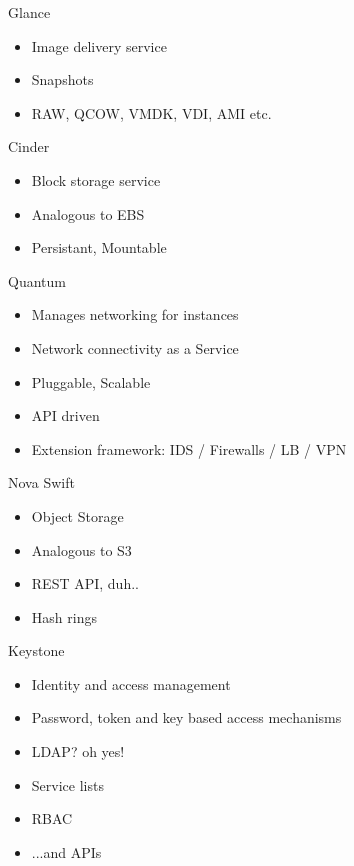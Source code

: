 \documentclass{beamer}
\begin{document}
\begin{frame}{Glance}
\begin{itemize}
 \item Image delivery service
 \item Snapshots
 \item RAW, QCOW, VMDK, VDI, AMI etc.
\end{itemize}
\end{frame}

\begin{frame}{Cinder}
\begin{itemize}
 \item Block storage service
 \item Analogous to EBS
 \item Persistant, Mountable
\end{itemize}
\end{frame}

\begin{frame}{Quantum}
\begin{itemize}
 \item Manages networking for instances
 \item Network connectivity as a Service
 \item Pluggable, Scalable
 \item API driven
 \item Extension framework: IDS / Firewalls / LB / VPN
\end{itemize}
\end{frame}

\begin{frame}{Nova Swift}
\begin{itemize}
 \item Object Storage
 \item Analogous to S3
 \item REST API, duh..
 \item Hash rings
\end{itemize}
\end{frame}

\begin{frame}{Keystone}
\begin{itemize}
 \item Identity and access management
 \item Password, token and key based access mechanisms
 \item LDAP? oh yes!
 \item Service lists
 \item RBAC
 \item ...and APIs
\end{itemize}
\end{frame}
\end{document}
